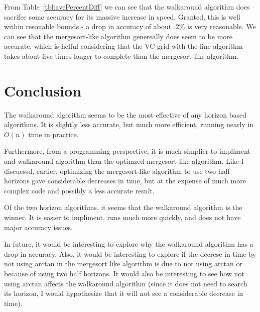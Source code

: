 \documentclass[11pt,twocolumn]{article}
\begin{document}
From Table~\ref{tbl:avePercentDiff} we can see that the walkaround algorithm does sacrifce some accuracy for its massive increase in speed.  Granted, this is well within resonable bounds - a drop in accuracy of about $.2\%$ is very reasonable.  We can see that the mergesort-like algorithm genereally does seem to be more accurate, which is helful considering that the VC grid with the line algorithm takes about five times longer to complete than the mergesort-like algorithm.

\section{Conclusion}
The walkaround algorithm seems to be the most effective of any horizon based algorithms.  It is slightly less accurate, but much more efficient, running nearly in $O(n)$ time in practice.  

Furthermore, from a programming perspective, it is much simplier to impliment and walkaround algorithm than the optimzed mergesort-like algorithm.  Like I discuessd, earlier, optimizing the mergesort-like algorithm to use two half horizons gave considerable decreases in time, but at the expense of much more complex code and possibly a less accurate result.

Of the two horizon algorithms, it seems that the walkaround algorithm is the winner.  It is easier to impliment, runs much more quickly, and does not have major accuracy issues.

In future, it would be interesting to explore why the walkaround algorithm has a drop in accuracy.  Also, it would be interesting to explore if the decrese in time by not using arctan in the mergesort like algorithm is due to not using arctan or because of using two half horizons.  It would also be interesting to see how not using arctan affects the walkaround algorithm (since it does not need to search its horizon, I would hypothesize that it will not see a considerable decrease in time).
\end{document}
